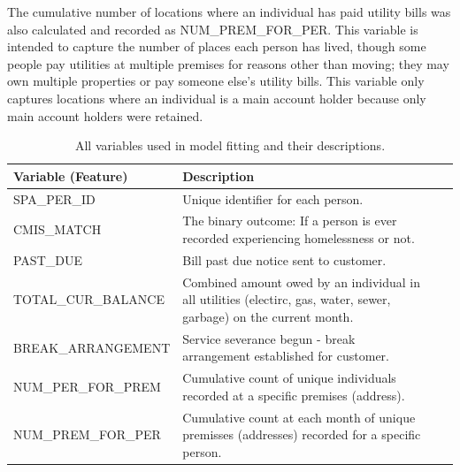 \documentclass[10pt,letterpaper]{article}
\begin{document}
The cumulative number of locations where an individual has paid utility bills was also calculated and recorded as NUM\_PREM\_FOR\_PER. This variable is intended to capture the number of places each person has lived, though some people pay utilities at multiple premises for reasons other than moving; they may own multiple properties or pay someone else's utility bills. This variable only captures locations where an individual is a main account holder because only main account holders were retained.

\begin{table}[htb]
    \centering
    \begin{tabular}{l p{8cm} l p{14cm}}
        \toprule
        Variable (Feature) &                  Description \\
        \midrule \vspace{0.25cm}
        SPA\_PER\_ID & Unique identifier for each person. \\
        \hline \vspace{0.25cm}
        CMIS\_MATCH & The binary outcome: If a person is ever recorded experiencing homelessness or not. \\
        \hline \vspace{0.25cm}
        PAST\_DUE & Bill past due notice sent to customer. \\
        \hline \vspace{0.25cm}
        TOTAL\_CUR\_BALANCE & Combined amount owed by an individual in all utilities (electirc, gas, water, sewer, garbage) on the current month. \\
        \hline \vspace{0.25cm}
        BREAK\_ARRANGEMENT & Service severance begun - break arrangement established for customer. \\
        \hline \vspace{0.25cm}
        NUM\_PER\_FOR\_PREM & Cumulative count of unique individuals recorded at a specific premises (address). \\
        \hline \vspace{0.25cm}
        NUM\_PREM\_FOR\_PER & Cumulative count at each month of unique premisses (addresses) recorded for a specific person. \\
        \midrule
    \end{tabular}
    \caption[Variables Used]{All variables used in model fitting and their descriptions.}
    \label{tbl:varsUsed}
\end{table}
\end{document}
